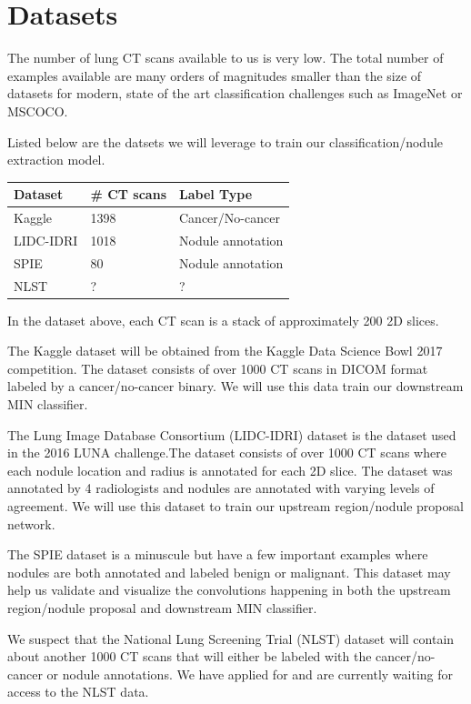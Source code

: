 \documentclass[twocolumn,10pt]{article}
\begin{document}
\section{Datasets}
The number of lung CT scans available to us is very low. The total number of examples
available are many orders of magn{}itudes smaller than the size of datasets for modern,
state of the art classification challenges such as ImageNet or MSCOCO.

Listed below are the datsets we will leverage to train our classification/nodule
extraction model.

\begin{center}
\begin{tabular}{lll}
  \toprule
  Dataset & \# CT scans & Label Type\\
  \midrule
  Kaggle&1398&Cancer/No-cancer\\
  LIDC-IDRI&1018&Nodule annotation\\
  SPIE&80&Nodule annotation\\
  NLST&?&?\\
\end{tabular}
\end{center}

In the dataset above, each CT scan is a stack of 
approximately 200 2D slices.

The Kaggle dataset will be obtained from the Kaggle Data Science Bowl 2017
competition. The dataset consists of over 1000 CT scans in DICOM format labeled
by a cancer/no-cancer binary. We will use this data train our downstream
 MIN classifier.

The Lung Image Database Consortium (LIDC-IDRI) dataset is the dataset used in 
the 2016 LUNA challenge.The dataset consists of over 1000 CT scans where
each nodule location and radius is annotated for each 2D slice. The dataset was
annotated by 4 radiologists and nodules are annotated with varying levels of 
agreement. We will use this dataset to train our upstream region/nodule 
proposal network.

The SPIE dataset is a minuscule but have a few important examples where nodules
are both annotated and labeled benign or malignant. This dataset may help us 
validate and visualize the convolutions happening in both the upstream
region/nodule proposal and downstream MIN classifier.

We suspect that the National Lung Screening Trial (NLST) dataset will contain 
about another 1000 CT scans that will either be labeled with the 
cancer/no-cancer or nodule annotations. We have applied for and are
currently waiting for access to the NLST data.
\end{document}
